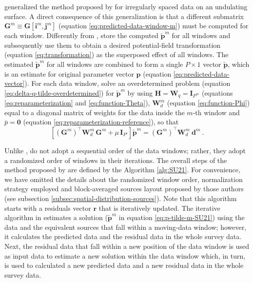 \documentclass[utf8]{FrontiersinHarvard} %
\begin{document}
	\cite{soler-uieda2021} generalized the method proposed by \cite{leao-silva1989} for irregularly spaced data on an undulating surface.
	A direct consequence of this generalization is that a different submatrix $\mathbf{G}^{m} \equiv \mathbf{G}[\mathbf{i}^{m}, \mathbf{j}^{m}]$ 
	(equation \ref{eq:predicted-data-window-m}) must be computed for each window.
	Differently from \cite{leao-silva1989}, \cite{soler-uieda2021} store the computed $\tilde{\mathbf{p}}^{m}$ for all windows and
	subsequently use them to obtain a desired potential-field transformation (equation \ref{eq:transformation}) as the superposed
	effect of all windows.
	The estimated $\tilde{\mathbf{p}}^{m}$ for all windows are combined to form a single $P \times 1$ vector $\tilde{\mathbf{p}}$,
	which is an estimate for original parameter vector $\mathbf{p}$ (equation \ref{eq:predicted-data-vector}).
	For each data window, \cite{soler-uieda2021} solve an overdetermined problem (equation \ref{eq:delta-q-tilde-overdetermined}) 
	for $\tilde{\mathbf{p}}^{m}$ by using 
	$\mathbf{H} = \mathbf{W}_{q} = \mathbf{I}_{P^{m}}$ (equations \ref{eq:reparameterization} and \ref{eq:function-Theta}),
	$\mathbf{W}^{m}_{d}$ (equation \ref{eq:function-Phi}) equal to a diagonal matrix of weights for the data inside the $m$-th window
	and $\bar{p} = \mathbf{0}$ (equation \ref{eq:reparameterization-reference}), so that
	\begin{equation}
		\left[ \left( \mathbf{G}^{m} \right)^{\top} \mathbf{W}^{m}_{d} \, \mathbf{G}^{m} + 
		\mu \, \mathbf{I}_{P'} \right] 
		\tilde{\mathbf{p}}^{m} = 
		\left( \mathbf{G}^{m} \right)^{\top} \mathbf{W}^{m}_{d} \: 
		\mathbf{d}^{m} \: .
		\label{eq:p-tilde-m-SU21}
	\end{equation}
	
	Unlike \cite{leao-silva1989}, \cite{soler-uieda2021} do not adopt a sequential order of the data windows; 
	rather, they adopt a randomized order of windows in their  iterations.
	The overall steps of the method proposed by \cite{soler-uieda2021} are defined by the Algorithm \ref{alg:SU21}.
	For convenience, we have omitted the details about the randomized window order, normalization strategy 
	employed and block-averaged sources layout proposed by those authors (see subsection \ref{subsec:spatial-distribution-sources}). 
	Note that this algorithm starts with a residuals vector $\mathbf{r}$ that is iteratively updated.
	The  iterative algorithm in \cite{soler-uieda2021} estimates a solution 
	($\tilde{\mathbf{p}}^{m}$ in equation \ref{eq:p-tilde-m-SU21}) using the data and 
	the equivalent sources that fall within a moving-data window; however, it calculates the predicted data and 
	the residual data in the whole survey data. 
	Next, the residual data  that fall within a new position of the data window is used as input data to estimate a new 
	solution within the data window which, in turn, is used to calculated a new predicted data and a new residual data 
	in the whole survey data.
	
\end{document}
